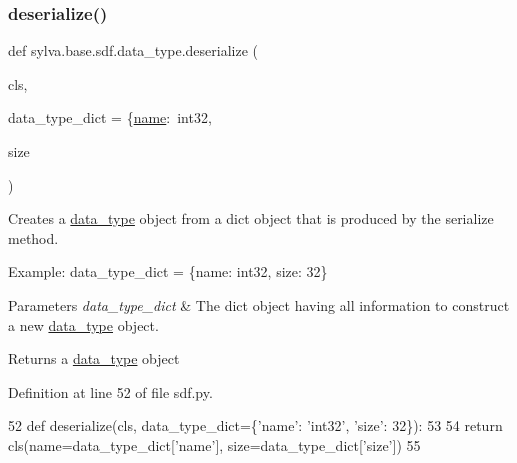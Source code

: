 \subsubsection{\texorpdfstring{deserialize()}{deserialize()}}
{\footnotesize\ttfamily def sylva.\+base.\+sdf.\+data\+\_\+type.\+deserialize (\begin{DoxyParamCaption}\item[{}]{cls,  }\item[{}]{data\+\_\+type\+\_\+dict = {\ttfamily \{\textquotesingle{}\hyperlink{classsylva_1_1base_1_1sdf_1_1data__type_a5bb984de0211b07ac2a1a882ff7b1744}{name}\textquotesingle{}\+:~\textquotesingle{}int32\textquotesingle{}},  }\item[{}]{size }\end{DoxyParamCaption})}



Creates a \hyperlink{classsylva_1_1base_1_1sdf_1_1data__type}{data\+\_\+type} object from a dict object that is produced by the serialize method. 

Example\+: data\+\_\+type\+\_\+dict = \{\textquotesingle{}name\textquotesingle{}\+: \textquotesingle{}int32\textquotesingle{}, \textquotesingle{}size\textquotesingle{}\+: 32\} 
\begin{DoxyParams}{Parameters}
{\em data\+\_\+type\+\_\+dict} & The dict object having all information to construct a new \hyperlink{classsylva_1_1base_1_1sdf_1_1data__type}{data\+\_\+type} object. \\
\hline
\end{DoxyParams}
\begin{DoxyReturn}{Returns}
a \hyperlink{classsylva_1_1base_1_1sdf_1_1data__type}{data\+\_\+type} object 
\end{DoxyReturn}


Definition at line 52 of file sdf.\+py.


\begin{DoxyCode}
52         \textcolor{keyword}{def }deserialize(cls, data\_type\_dict=\{'name': \textcolor{stringliteral}{'int32'}, \textcolor{stringliteral}{'size'}: 32\}):
53 
54             \textcolor{keywordflow}{return} cls(name=data\_type\_dict[\textcolor{stringliteral}{'name'}], size=data\_type\_dict[\textcolor{stringliteral}{'size'}])
55 
\end{DoxyCode}
\mbox{\label{classsylva_1_1base_1_1sdf_1_1data__type_a0996089b8e4a7e6ab35bc5f53704f6c4}} 
